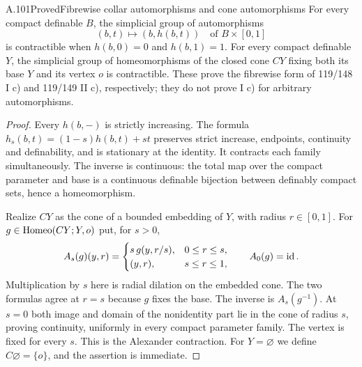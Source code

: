 \begin{saresult}{A.101}{Proved}{Fibrewise collar automorphisms and cone automorphisms}
For every compact definable $B$, the simplicial group of automorphisms
\[
 (b,t)\longmapsto(b,h(b,t))\quad\text{of }B\times[0,1]
\]
is contractible when $h(b,0)=0$ and $h(b,1)=1$. For every compact
definable $Y$, the simplicial group of homeomorphisms of the closed
cone $CY$ fixing both its base $Y$ and its vertex $o$ is contractible.
These prove the fibrewise form of 119/148 I c) and 119/149 II c),
respectively; they do not prove I c) for arbitrary automorphisms.
\end{saresult}
\begin{proof}
Every $h(b,-)$ is strictly increasing. The formula
$h_s(b,t)=(1-s)h(b,t)+st$ preserves strict increase, endpoints,
continuity and definability, and is stationary at the identity. It
contracts each family simultaneously. The inverse is continuous:
the total map over the compact parameter and base is a continuous
definable bijection between definably compact sets, hence a homeomorphism.

Realize $CY$ as the cone of a bounded embedding of $Y$, with radius
$r\in[0,1]$. For $g\in\operatorname{Homeo}(CY;Y,o)$ put, for $s>0$,
\[
 A_s(g)(y,r)=
 \begin{cases}
 s\,g(y,r/s),&0\leq r\leq s,\\
 (y,r),&s\leq r\leq1,
 \end{cases}
 \qquad A_0(g)=\operatorname{id}.
\]
Multiplication by $s$ here is radial dilation on the embedded cone.
The two formulas agree at $r=s$ because $g$ fixes the base. The inverse
is $A_s(g^{-1})$. At $s=0$ both image and domain of the nonidentity
part lie in the cone of radius $s$, proving continuity, uniformly in
every compact parameter family. The vertex is fixed for every $s$.
This is the Alexander contraction. For $Y=\varnothing$ we define
$C\varnothing=\{o\}$, and the assertion is immediate.
\end{proof}

